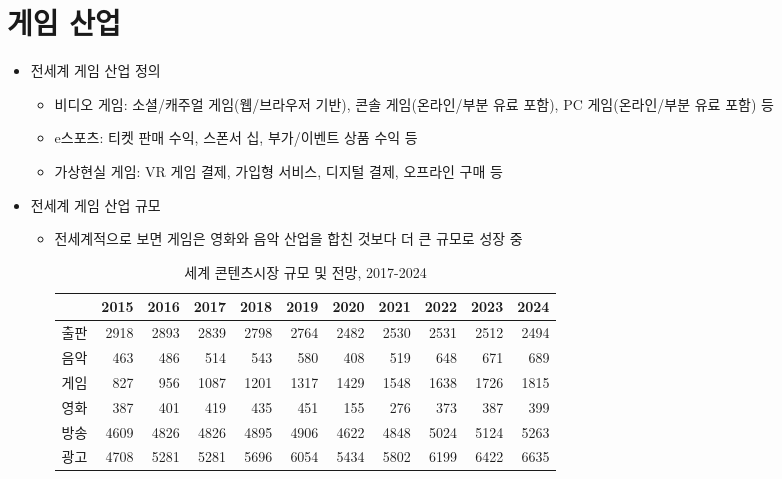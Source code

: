 \section{게임 산업}\label{sec:}
\begin{itemize}
\item 전세계 게임 산업 정의
	\begin{itemize}
	\item 비디오 게임: 소셜/캐주얼 게임(웹/브라우저 기반), 콘솔 게임(온라인/부분 유료 포함), PC 게임(온라인/부분 유료 포함) 등
	\item e스포츠: 티켓 판매 수익, 스폰서 십, 부가/이벤트 상품 수익 등
	\item 가상현실 게임: VR 게임 결제, 가입형 서비스, 디지털 결제, 오프라인 구매 등
	\end{itemize}
\item 전세계 게임 산업 규모
	\begin{itemize}
	\item 전세계적으로 보면 게임은 영화와 음악 산업을 합친 것보다 더 큰 규모로 성장 중
		
		\begin{table}[htp]
		\begin{center}
		\begin{threeparttable}
		\caption{세계 콘텐츠시장 규모 및 전망, 2017-2024}\label{tab:worldcontentsmarket}
		\begin{tabularx}{\textwidth}{lrrrrrrrrrr}
		\toprule
		& 2015	& 2016	& 2017	& 2018	& 2019	& 2020	& 2021	& 2022	& 2023	& 2024 \\
		\midrule
		출판&	2918	& 2893	& 2839	& 2798	& 2764	& 2482	& 2530	& 2531	& 2512 & 	2494 \\
		음악&	463 & 	486 & 	514	 & 543	& 580 & 	408 & 	519 & 	648 & 	671 & 	689 \\
		게임&	827	& 956 & 	1087	& 1201	& 1317	& 1429	& 1548	& 1638	& 1726	& 1815 \\
		영화&	387	& 401& 	419& 	435 & 	451& 	155& 	276& 	373& 	387& 	399 \\
		방송&	4609	& 4826	& 4826 & 	4895	& 4906	& 4622	& 4848 & 	5024	& 5124	& 5263 \\
		광고&	4708	& 5281	& 5281	& 5696 & 	6054 & 	5434	 & 5802	& 6199	& 6422	& 6635 \\
		\bottomrule
		\end{tabularx}
		\begin{tablenotes}
		\small
		\item 단위: 억 달러
		\item 출처: \cite{PWC:2020tx}, \cite{hangugkontencheujinheung-won:2020tl} p. 11 재인용.
		\end{tablenotes}
		\end{threeparttable}
		\end{center}
		\end{table}%
		

\end{itemize}
\end{itemize}
